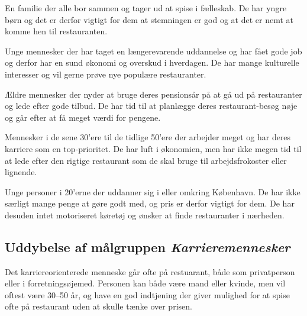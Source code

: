 \documentclass[a4paper, 12pt]{article}
\begin{document}
\begin{description}[style=nextline,font=\bf]
  \item[Familier med små børn]

    En familie der alle bor sammen og tager ud at spise i
    fælleskab. De har yngre børn og det er derfor vigtigt for dem at
    stemningen er god og at det er nemt at komme hen til restauranten.

  \item[25--30 årige storby-par uden børn]

    Unge mennesker der har taget en længerevarende uddannelse og har
    fået gode job og derfor har en sund økonomi og overskud i
    hverdagen. De har mange kulturelle interesser og vil gerne prøve
    nye populære restauranter.

  \item[Pensionister]

    Ældre mennesker der nyder at bruge deres pensionsår på at gå ud på
    restauranter og lede efter gode tilbud. De har tid til at
    planlægge deres restaurant-besøg nøje og går efter at få meget
    værdi for pengene.

  \item[Karrieremennesker]

    Mennesker i de sene 30'ere til de tidlige 50'ere der arbejder
    meget og har deres karriere som en top-prioritet. De har luft i
    økonomien, men har ikke megen tid til at lede efter den rigtige
    restaurant som de skal bruge til arbejdsfrokoster eller lignende.

  \item[Studerende]

    Unge personer i 20'erne der uddanner sig i eller omkring
    København. De har ikke særligt mange penge at gøre godt med, og
    pris er derfor vigtigt for dem. De har desuden intet motoriseret
    køretøj og ønsker at finde restauranter i nærheden.
\end{description}

\subsection{Uddybelse af målgruppen \emph{Karrieremennesker}}
Det karriereorienterede menneske går ofte på restuarant, både som privatperson
eller i forretningsøjemed. Personen kan både være mand eller kvinde, men vil
oftest være 30--50 år, og have en god indtjening der giver mulighed for at spise
ofte på restaurant uden at skulle tænke over prisen.
\end{document}
